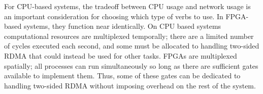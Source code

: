 For CPU-based systems, the tradeoff between CPU usage and network usage is an important consideration for choosing which type of verbs to use. In FPGA-based systems, they function near identically. On CPU based systems computational resources are multiplexed temporally; there are a limited number of cycles executed each second, and some must be allocated to handling two-sided RDMA that could instead be used for other tasks. FPGAs are multiplexed spatially; all processes can run simultaneously so long as there are sufficient gates available to implement them. Thus, some of these gates can be dedicated to handling two-sided RDMA without imposing overhead on the rest of the system.
